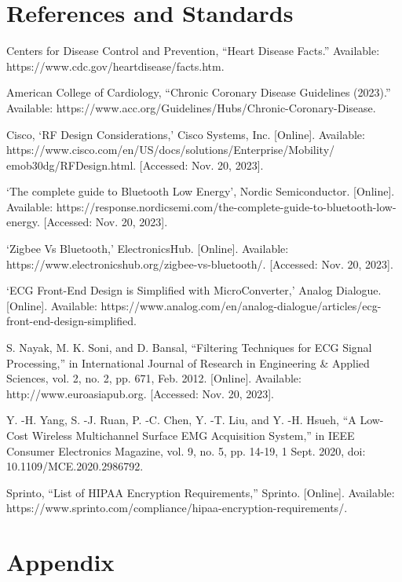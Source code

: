 \documentclass{article}
\begin{document}
\section{References and Standards}
\begin{thebibliography}{9}
    Centers for Disease Control and Prevention, ``Heart Disease Facts.'' Available: https://www.cdc.gov/heartdisease/facts.htm.
    
    American College of Cardiology, ``Chronic Coronary Disease Guidelines (2023).'' Available: https://www.acc.org/Guidelines/Hubs/Chronic-Coronary-Disease.
    
    Cisco, `RF Design Considerations,' Cisco Systems, Inc. [Online]. Available: https://www.cisco.com/en/US/docs/solutions/Enterprise/Mobility/
    emob30dg/RFDesign.html. [Accessed: Nov. 20, 2023].
    
    `The complete guide to Bluetooth Low Energy', Nordic Semiconductor. [Online]. Available: https://response.nordicsemi.com/the-complete-guide-to-bluetooth-low-energy. [Accessed: Nov. 20, 2023].
    
    `Zigbee Vs Bluetooth,' ElectronicsHub. [Online]. Available: https://www.electronicshub.org/zigbee-vs-bluetooth/. [Accessed: Nov. 20, 2023].
    
    `ECG Front-End Design is Simplified with MicroConverter,' Analog Dialogue. [Online]. Available: https://www.analog.com/en/analog-dialogue/articles/ecg-front-end-design-simplified.
    
    S. Nayak, M. K. Soni, and D. Bansal, ``Filtering Techniques for ECG Signal Processing,'' in International Journal of Research in Engineering \& Applied Sciences, vol. 2, no. 2, pp. 671, Feb. 2012. [Online]. Available: http://www.euroasiapub.org. [Accessed: Nov. 20, 2023].
    
    Y. -H. Yang, S. -J. Ruan, P. -C. Chen, Y. -T. Liu, and Y. -H. Hsueh, ``A Low-Cost Wireless Multichannel Surface EMG Acquisition System,'' in IEEE Consumer Electronics Magazine, vol. 9, no. 5, pp. 14-19, 1 Sept. 2020, doi: 10.1109/MCE.2020.2986792.
    
    Sprinto, ``List of HIPAA Encryption Requirements,'' Sprinto. [Online]. Available: https://www.sprinto.com/compliance/hipaa-encryption-requirements/.
\end{thebibliography}
    
\section{Appendix}
\end{document}
